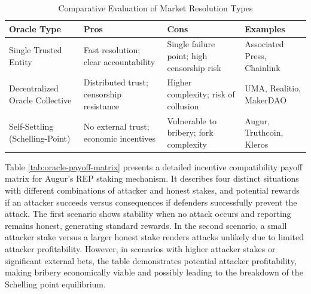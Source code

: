 {\begin{table}[htbp]
    \centering
    \caption{Comparative Evaluation of Market Resolution Types}
    \begin{tabular}{
        |p{3.5cm}|
        >{\centering\arraybackslash}p{3.5cm}|
        >{\centering\arraybackslash}p{3.8cm}|
        >{\centering\arraybackslash}p{3.5cm}|
    }
       \hline \textbf{Oracle Type} & \textbf{Pros} & \textbf{Cons} & \textbf{Examples} \\
       \hline Single Trusted Entity & Fast resolution; clear accountability & Single failure point; high censorship risk & Associated Press, Chainlink \\
       \hline Decentralized Oracle Collective & Distributed trust; censorship resistance & Higher complexity; risk of collusion & UMA, Realitio, MakerDAO \\
       \hline Self-Settling (Schelling-Point) & No external trust; economic incentives & Vulnerable to bribery; fork complexity & Augur, Truthcoin, Kleros \\
       \hline
     \end{tabular}
     \label{tab:market-resolution-types}
\end{table}

Table \ref{tab:oracle-payoff-matrix} presents a detailed incentive compatibility payoff matrix for Augur’s REP staking mechanism. It describes four distinct situations with different combinations of attacker and honest stakes, and potential rewards if an attacker succeeds versus consequences if defenders successfully prevent the attack. The first scenario shows stability when no attack occurs and reporting remains honest, generating standard rewards. In the second scenario, a small attacker stake versus a larger honest stake renders attacks unlikely due to limited attacker profitability. However, in scenarios with higher attacker stakes or significant external bets, the table demonstrates potential attacker profitability, making bribery economically viable and possibly leading to the breakdown of the Schelling point equilibrium.

}
